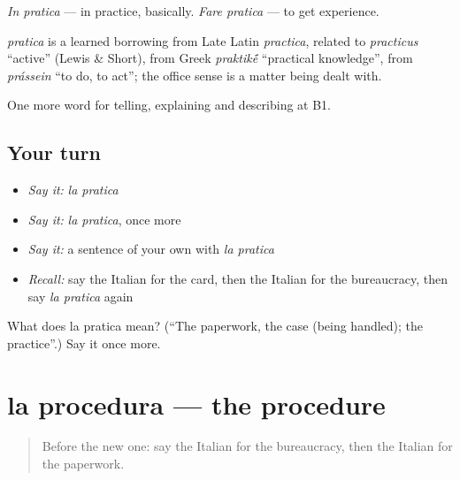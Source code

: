 \emph{In pratica} — in practice, basically. \emph{Fare pratica} — to get experience.

\begin{cousinweb}
\emph{pratica} is a learned borrowing from Late Latin \emph{practica}, related to \emph{practicus} \textquotedblleft{}active\textquotedblright{} (Lewis \& Short), from Greek \emph{praktik\'{\={e}}} \textquotedblleft{}practical knowledge\textquotedblright{}, from \emph{prássein} \textquotedblleft{}to do, to act\textquotedblright{}; the office sense is a matter being dealt with.
\end{cousinweb}

\begin{grammarlens}[title={What you've built}]
One more word for telling, explaining and describing at B1.
\end{grammarlens}

\subsection*{Your turn}
\begin{itemize}
\raggedright
  \item \emph{Say it:} \emph{la pratica}
  \item \emph{Say it:} \emph{la pratica}, once more
  \item \emph{Say it:} a sentence of your own with \emph{la pratica}
  \item \emph{Recall:} say the Italian for the card, then the Italian for the bureaucracy, then say \emph{la pratica} again
\end{itemize}

\begin{tcolorbox}[breakable,colback=teal!4,colframe=teal!35!black,title={Before you move on}]
What does la pratica mean? (\textquotedblleft{}The paperwork, the case (being handled); the practice\textquotedblright{}.) Say it once more.
\end{tcolorbox}
\section[la procedura]{la procedura — the procedure}

\label{lesson:IT-C389-procedura}



\begin{quote}
Before the new one: say the Italian for the bureaucracy, then the Italian for the paperwork.
\end{quote}

